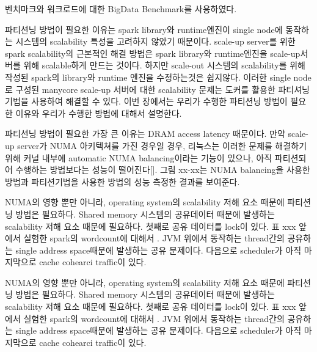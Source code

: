 \ifkor
벤치마크와 워크로드에 대한 BigData Benchmark를 사용하였다.
\else

\fi


\ifkor
파티션닝 방법이 필요한 이유는 spark library와 runtime엔진이 single node에 동작하는 
시스템의 scalability 특성을 고려하지 않았기 때문이다. 
scale-up server를 위한 spark scalability의 근본적인 해결 방법은 spark library와 
runtime엔진을 scale-up서버를 위해 scalable하게 만드는 것이다.
하지만 scale-out 시스템의 scalability를 위해 작성된 spark의 library와 runtime 엔진을 
수정하는것은 쉽지않다.
이러한 single node로 구성된 manycore scale-up 서버에 대한 scalability
문제는 도커를 활용한 파티셔닝 기법을 사용하여 해결할 수 있다.
이번 장에서는 우리가 수행한 파티션닝 방법이 필요한 이유와 우리가 수행한 방법에 대해서 설명한다.
\else

\fi

\ifkor
파티션닝 방법이 필요한 가장 큰 이유는 DRAM access latency 때문이다. 
만약 scale-up server가 NUMA 아키텍쳐를 가진 경우일 경우, 
리눅스는 이러한 문제를 해결하기 위해 커널 내부에 automatic NUMA balancing이라는 기능이 있으나, 
아직 파티션되어 수행하는 방법보다는 성능이 떨어진다[]. 그림 xx-xx는 NUMA balancing을 
사용한 방법과 파티션기법을 사용한 방법의 성능 측정한 결과를 보여준다. 
\else

\fi

\ifkor
NUMA의 영향 뿐만 아니라, operating system의 scalability 저해 요소 때문에 파티션닝 방법은 필요하다.
Shared memory 시스템의 공유데이터 때문에 발생하는 scalability 저해 요소 때문에 필요하다.
첫째로 공유 데이터를 lock이 있다. 표 xxx 앞에서 실험한 spark의 wordcount에 대해서 .
JVM 위에서 동작하는 thread간의 공유하는 single address space때문에 발생하는 공유 문제이다.
다음으로 scheduler가 아직 
마지막으로 cache cohearci traffic이 있다. 

\else

\fi


\ifkor
NUMA의 영향 뿐만 아니라, operating system의 scalability 저해 요소 때문에 파티션닝 방법은 필요하다.
Shared memory 시스템의 공유데이터 때문에 발생하는 scalability 저해 요소 때문에 필요하다.
첫째로 공유 데이터를 lock이 있다. 표 xxx 앞에서 실험한 spark의 wordcount에 대해서 .
JVM 위에서 동작하는 thread간의 공유하는 single address space때문에 발생하는 공유 문제이다.
다음으로 scheduler가 아직 
마지막으로 cache cohearci traffic이 있다. 

\else

\fi

